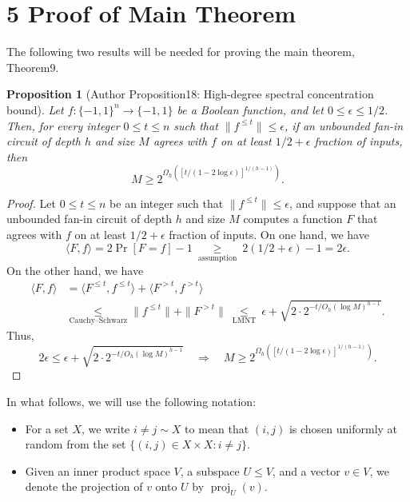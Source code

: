 \documentclass[10pt,a4paper]{article}
\newtheorem{ntproposition}[nttheorem]{Proposition}
\begin{document}
\section*{5 Proof of Main Theorem}
The following two results will be needed for proving the main theorem, Theorem9.
\setcounter{nttheorem}{17}
\begin{ntproposition}[Author Proposition18: High-degree spectral concentration bound]
Let $f:\{-1,1\}^n\to\{-1,1\}$ be a Boolean function, and let $0\leq\epsilon\leq1/2$. Then, for every integer $0\leq t\leq n$ such that $\|f^{\leq t}\|\leq\epsilon$, if an unbounded fan-in circuit of depth $h$ and size $M$ agrees with $f$ on at least $1/2+\epsilon$ fraction of inputs, then
\[M\geq2^{\Omega_h([t/(1-2\log\epsilon)]^{1/(h-1)})}.\]
\end{ntproposition}
\begin{proof}
Let $0\leq t\leq n$ be an integer such that $\|f^{\leq t}\|\leq\epsilon$, and suppose that an unbounded fan-in circuit of depth $h$ and size $M$ computes a function $F$ that agrees with $f$ on at least $1/2+\epsilon$ fraction of inputs.
On one hand, we have
\[\langle F,f\rangle=2\Pr[F=f]-1\ \underset{\text{assumption}}\geq\ 2(1/2+\epsilon)-1=2\epsilon.\]
On the other hand, we have
\begin{align*}\langle F,f\rangle&=\langle F^{\leq t},f^{\leq t}\rangle+\langle F^{>t},f^{>t}\rangle\\&\underset{\text{Cauchy--Schwarz}}\leq\|f^{\leq t}\|+\|F^{>t}\|\ \underset{\text{LMNT}}\leq\ \epsilon+\sqrt{2\cdot2^{-t/O_h(\log M)^{h-1}}}.\end{align*}
Thus,
\[2\epsilon\leq\epsilon+\sqrt{2\cdot2^{-t/O_h(\log M)^{h-1}}}\quad\Longrightarrow\quad M\geq2^{\Omega_h([t/(1-2\log\epsilon)]^{1/(h-1)})}.\]
\end{proof}
In what follows, we will use the following notation:
\begin{itemize}
\item For a set $X$, we write $i\ne j\sim X$ to mean that $(i,j)$ is chosen uniformly at random from the set $\{(i,j)\in X\times X:i\ne j\}$.
\item Given an inner product space $V$, a subspace $U\leq V$, and a vector $v\in V$, we denote the projection of $v$ onto $U$ by $\operatorname{proj}_U(v)$.
\end{itemize}
\end{document}
